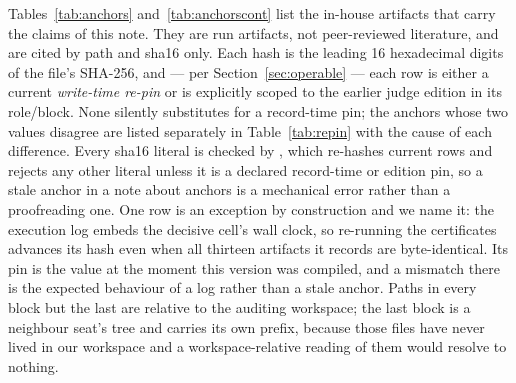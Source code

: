 \documentclass{article}
\begin{document}
Tables~\ref{tab:anchors} and~\ref{tab:anchorscont} list the in-house artifacts that carry
the claims of this note.
They are run artifacts, not peer-reviewed literature, and are cited by path and sha16
only. Each hash is the leading 16 hexadecimal digits of the file's SHA-256, and --- per
Section~\ref{sec:operable} --- each row is either a current \emph{write-time re-pin} or is
explicitly scoped to the earlier judge edition in its role/block. None silently substitutes
for a record-time pin; the anchors whose two values disagree are listed separately in
Table~\ref{tab:repin} with the cause of each difference. Every sha16 literal is checked by
, which re-hashes current rows and rejects any other
literal unless it is a declared record-time or edition pin, so a stale anchor in a note about
anchors is a mechanical error rather than a proofreading one. One row is an exception by construction and we name it:
the execution log embeds the decisive cell's wall clock, so re-running the certificates
advances its hash even when all thirteen artifacts it records are byte-identical. Its pin is
the value at the moment this version was compiled, and a mismatch there is the expected
behaviour of a log rather than a stale anchor. Paths in every block but the last are relative
to the auditing workspace; the last block is a neighbour seat's tree and carries its own prefix,
because those files have never lived in our workspace and a workspace-relative reading of them
would resolve to nothing.
\end{document}
